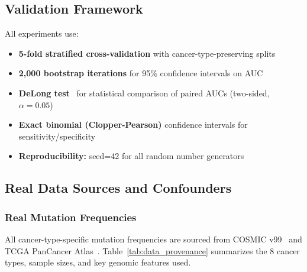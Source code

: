 \documentclass[10pt,a4paper]{article}
\begin{document}
\subsection{Validation Framework}

All experiments use:

\begin{itemize}[nosep]
\item \textbf{5-fold stratified cross-validation} with cancer-type-preserving splits
\item \textbf{2,000 bootstrap iterations} for 95\% confidence intervals on AUC
\item \textbf{DeLong test}~\cite{delong1988comparing} for statistical comparison of paired AUCs (two-sided, $\alpha = 0.05$)
\item \textbf{Exact binomial (Clopper-Pearson)} confidence intervals for sensitivity/specificity
\item \textbf{Reproducibility:} seed=42 for all random number generators
\end{itemize}

\subsection{Real Data Sources and Confounders}

\subsubsection{Real Mutation Frequencies}

All cancer-type-specific mutation frequencies are sourced from COSMIC v99~\cite{tate2019cosmic} and TCGA PanCancer Atlas~\cite{ellrott2018scalable,bailey2018comprehensive}. Table~\ref{tab:data_provenance} summarizes the 8 cancer types, sample sizes, and key genomic features used.
\end{document}

